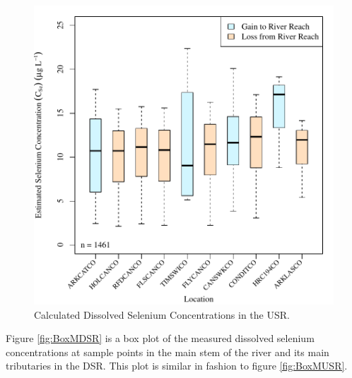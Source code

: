 \begin{figure}[htbp]
\centering
	\includegraphics[width=6in]{"Figures/Results_USR/Stochastic/c BOX Estimated CSe"}
	\caption[Calculated Dissolved Selenium Concentrations in the USR.]{Calculated Dissolved Selenium Concentrations in the USR.}
	\label{fig:BoxCUSR}
\end{figure}

Figure \ref{fig:BoxMDSR} is a box plot of the measured dissolved selenium concentrations at sample points in the main stem of the river and its main tributaries in the DSR.  This plot is similar in fashion to figure \ref{fig:BoxMUSR}.

